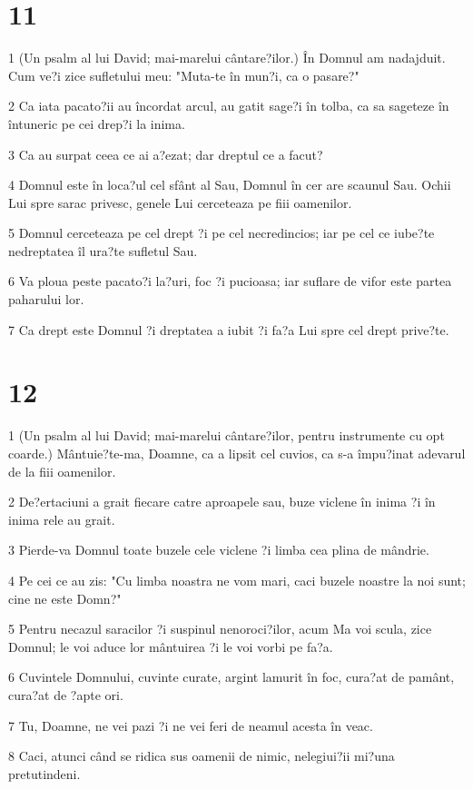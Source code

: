 \chapter{11}

\par 1 (Un psalm al lui David; mai-marelui cântare?ilor.) În Domnul am nadajduit. Cum ve?i zice sufletului meu: "Muta-te în mun?i, ca o pasare?"
\par 2 Ca iata pacato?ii au încordat arcul, au gatit sage?i în tolba, ca sa sageteze în întuneric pe cei drep?i la inima.
\par 3 Ca au surpat ceea ce ai a?ezat; dar dreptul ce a facut?
\par 4 Domnul este în loca?ul cel sfânt al Sau, Domnul în cer are scaunul Sau. Ochii Lui spre sarac privesc, genele Lui cerceteaza pe fiii oamenilor.
\par 5 Domnul cerceteaza pe cel drept ?i pe cel necredincios; iar pe cel ce iube?te nedreptatea îl ura?te sufletul Sau.
\par 6 Va ploua peste pacato?i la?uri, foc ?i pucioasa; iar suflare de vifor este partea paharului lor.
\par 7 Ca drept este Domnul ?i dreptatea a iubit ?i fa?a Lui spre cel drept prive?te.

\chapter{12}

\par 1 (Un psalm al lui David; mai-marelui cântare?ilor, pentru instrumente cu opt coarde.) Mântuie?te-ma, Doamne, ca a lipsit cel cuvios, ca s-a împu?inat adevarul de la fiii oamenilor.
\par 2 De?ertaciuni a grait fiecare catre aproapele sau, buze viclene în inima ?i în inima rele au grait.
\par 3 Pierde-va Domnul toate buzele cele viclene ?i limba cea plina de mândrie.
\par 4 Pe cei ce au zis: "Cu limba noastra ne vom mari, caci buzele noastre la noi sunt; cine ne este Domn?"
\par 5 Pentru necazul saracilor ?i suspinul nenoroci?ilor, acum Ma voi scula, zice Domnul; le voi aduce lor mântuirea ?i le voi vorbi pe fa?a.
\par 6 Cuvintele Domnului, cuvinte curate, argint lamurit în foc, cura?at de pamânt, cura?at de ?apte ori.
\par 7 Tu, Doamne, ne vei pazi ?i ne vei feri de neamul acesta în veac.
\par 8 Caci, atunci când se ridica sus oamenii de nimic, nelegiui?ii mi?una pretutindeni.

